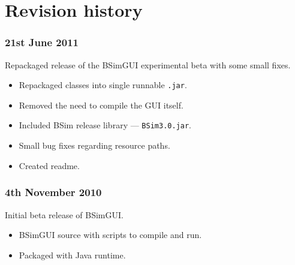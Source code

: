 \documentclass[a4paper,11pt]{article}
\newenvironment{revisionList}
{\begin{itemize}%
	\setlength{\itemsep}{0.1em}%
	\setlength{\parskip}{0pt}%
	\setlength{\parsep}{0pt}}
{\end{itemize}}
\begin{document}
\section{Revision history}
\subsubsection{21st June 2011}
Repackaged release of the BSimGUI experimental beta with some small fixes.
\begin{revisionList}
\item Repackaged classes into single runnable \texttt{.jar}.
\item Removed the need to compile the GUI itself.
\item Included BSim release library --- \texttt{BSim3.0.jar}.
\item Small bug fixes regarding resource paths.
\item Created readme.
\end{revisionList}

\subsubsection{4th November 2010}
Initial beta release of BSimGUI.
\begin{revisionList}
\item BSimGUI source with scripts to compile and run.
\item Packaged with Java runtime.
\end{revisionList}
\end{document}
